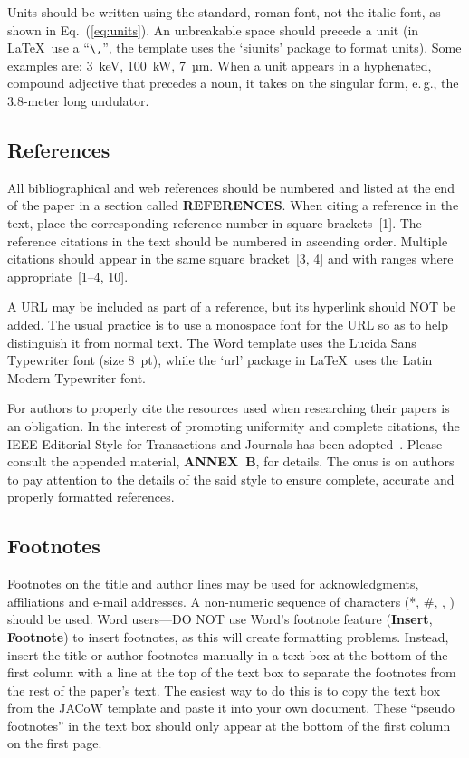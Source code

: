 \documentclass[letterpaper,  %
              ]{jacow-2_3}   %
\newcommand\SEC[1]{\textbf{\uppercase{#1}}}
\begin{document}
{{Units should be written using the standard, roman font,
not the italic font, as shown in Eq.~(\ref{eq:units}).
An unbreakable space should precede a unit (in \LaTeX\ use a “\verb|\,|”,
the template uses the ‘siunits’ package to format units).
Some examples are: \SI{3}{keV},
\SI{100}{kW}, \SI{7}{µm}. When a unit appears in a hyphenated,
compound adjective that precedes a noun, it takes on the
singular form, e.\,g., the 3.8-meter long undulator.

\subsection{References}
%
%
All bibliographical and web references should be numbered and listed at the
end of the paper in a section called \SEC{References}. When citing a
reference in the text, place the corresponding reference number in square
brackets~[1]. The reference citations in the text should be numbered
in ascending order. Multiple citations should appear in
the same square bracket~[3, 4] and
with ranges where appropriate~[1--4, 10].

A URL may be included as part of a reference, but its
hyperlink should NOT be added. The usual practice is to
use a monospace font for the URL so as to help distinguish
it from normal text. The Word template uses the
Lucida Sans Typewriter font (size \SI{8}{pt}), while the ‘url’ 
package in \LaTeX\ uses the Latin Modern Typewriter font.

For authors to properly cite the resources used when researching
their papers is an obligation. In the interest of
promoting uniformity and complete citations, the IEEE
Editorial Style for Transactions and Journals has been
adopted~\cite{IEEE}. Please consult the appended material, \SEC{Annex~B},
for details. The onus is on authors to pay attention to
the details of the said style to ensure complete, accurate
and properly formatted references.

\subsection{Footnotes}

Footnotes on the title and author lines may be used for acknowledgments,
affiliations and e-mail addresses. A non-numeric sequence of characters (*, \#,
\dag, \ddag) should be used.
Word users---DO NOT use Word's footnote feature (\textbf{Insert}, \textbf{Footnote})
to insert footnotes, as this will create formatting problems. Instead, insert
the title or author footnotes manually in a text box at the bottom of the first column with a
line at the top of the text box to separate the footnotes from the rest of
the paper's text.  The easiest way to do this is to copy the text box from
the JACoW template and paste it into your own document.
These “pseudo footnotes” in the text box should only
appear at the bottom of the first column on the first page.

}}
\end{document}

